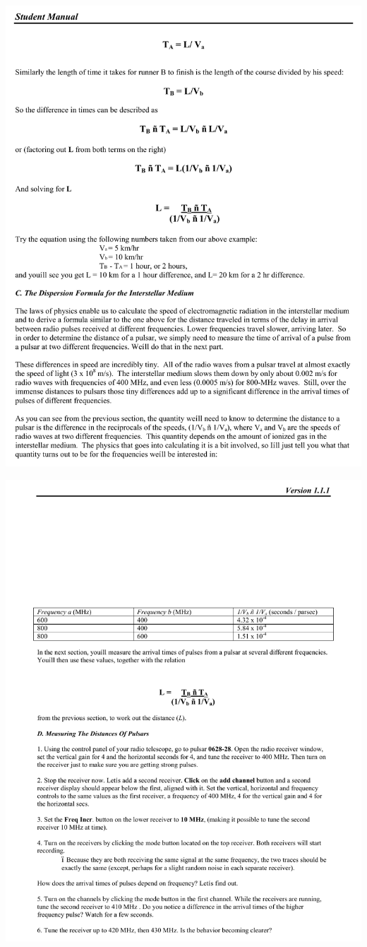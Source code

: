 \includegraphics[width=\textwidth]{pulsars/pulsar8.pdf}
\vfil\eject

\includegraphics[width=\textwidth]{pulsars/pulsar9.pdf}
\vfil\eject

